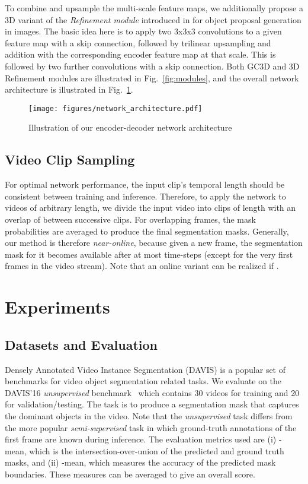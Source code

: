 \documentclass{bmvc2k_arxiv}
\newcommand{\PAR}[1]{\vskip4pt \noindent {\bf #1~}}
\begin{document}
To combine and upsample the multi-scale feature maps, we additionally propose a 3D variant of the \textit{Refinement module} introduced in \cite{Pinheiro16ECCV} for object proposal generation in images. The basic idea here is to apply two 3x3x3 convolutions to a given feature map with a skip connection, followed by trilinear upsampling and addition with the corresponding encoder feature map at that scale. This is followed by two further convolutions with a skip connection. Both GC3D and 3D Refinement modules are illustrated in Fig.~\ref{fig:modules}, and the overall network architecture is illustrated in Fig.~\ref{fig:network_architecture}.

\begin{figure}
    \centering
    \texttt{[image: figures/network\_architecture.pdf]}
    \caption{Illustration of our encoder-decoder network architecture}
    \label{fig:network_architecture}
\end{figure}

\subsection{Video Clip Sampling}
\label{sec:clip_sampling}

For optimal network performance, the input clip's temporal length should be consistent between training and inference. Therefore, to apply the network to videos of arbitrary length, we divide the input video into clips of length  with an overlap of  between successive clips. For overlapping frames, the mask probabilities are averaged to produce the final segmentation masks. Generally, our method is therefore \textit{near-online}, because given a new frame, the segmentation mask for it becomes available after at most  time-steps (except for the very first  frames in the video stream). Note that an online variant can be realized if .



 
\section{Experiments}
\label{sec:experiments}

\subsection{Datasets and Evaluation}

\PAR{DAVIS'16.} Densely Annotated Video Instance Segmentation (DAVIS) is a popular set of benchmarks for video object segmentation related tasks. We evaluate on the DAVIS'16 \textit{unsupervised} benchmark~\cite{Perazzi16CVPR} which contains 30 videos for training and 20 for validation/testing. 
The task is to produce a segmentation mask that captures the dominant objects in the video. 
Note that the \textit{unsupervised} task differs from the more popular \textit{semi-supervised} task in which ground-truth annotations of the first frame are known during inference. The evaluation metrics used are (i) -mean, which is the intersection-over-union of the predicted and ground truth masks, and (ii) -mean, which measures the accuracy of the predicted mask boundaries. These measures can be averaged to give an overall  score.
\end{document}
